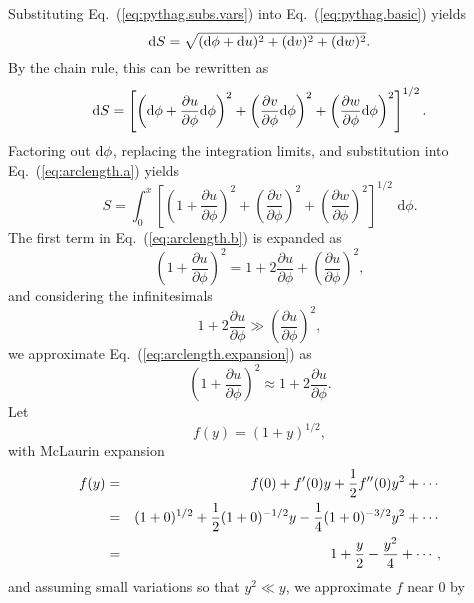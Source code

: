 Substituting Eq.~(\ref{eq:pythag.subs.vars}) into Eq.~(\ref{eq:pythag.basic}) yields
\begin{equation}
\text dS = \sqrt{(\text d\phi + \text du)^2+(\text dv)^2+(\text dw)^2}.
\end{equation} 
By the chain rule, this can be rewritten as
\begin{equation}
\text dS = \left[\left(\text d\phi + \frac{\partial u}{\partial\phi}\text d\phi\right)^2+\left(\frac{\partial v}{\partial\phi}\text d\phi\right)^2+\left(\frac{\partial w}{\partial\phi}\text d\phi\right)^2\right]^{1/2}.
\end{equation}
Factoring out $\text d\phi$, replacing the integration limits, and substitution into Eq.~(\ref{eq:arclength.a}) yields
\begin{equation}
S = \int_0^x \left[\left(1 + \frac{\partial u}{\partial\phi}\right)^2+\left(\frac{\partial v}{\partial\phi}\right)^2+\left(\frac{\partial w}{\partial\phi}\right)^2\right]^{1/2}\text{ d}\phi.
\label{eq:arclength.b}
\end{equation}
The first term in Eq.~(\ref{eq:arclength.b}) is expanded as
\begin{equation}
\left(1 + \frac{\partial u}{\partial\phi}\right)^2 = 1+2\frac{\partial u}{\partial\phi}+\left(\frac{\partial u}{\partial\phi}\right)^2,
\label{eq:arclength.expansion}
\end{equation}
and considering the infinitesimals
\begin{equation}
\label{eq:arclength.u.assump}
1+2\frac{\partial u}{\partial\phi} \gg \left(\frac{\partial u}{\partial\phi}\right)^2,
\end{equation}
we approximate Eq.~(\ref{eq:arclength.expansion}) as
\begin{equation}
\left(1 + \frac{\partial u}{\partial\phi}\right)^2 \approx 1+2\frac{\partial u}{\partial\phi}.
\label{eq:arclength.u.approx}
\end{equation}
Let
\begin{equation}
f(y) = (1+y)^{1/2},
\end{equation}
with McLaurin expansion
\begin{eqnarray}
f(y) &=& f(0)+f'(0)y+\frac{1}{2}f''(0)y^2+\cdots{\vrule width 0in depth .1in}\nonumber \\
&=& (1+0)^{1/2}+\frac{1}{2}(1+0)^{-1/2}y-\frac{1}{4}(1+0)^{-3/2}y^2+\cdots{\vrule width 0in depth .1in}\nonumber \\
&=& 1+\frac{y}{2}-\frac{y^2}{4}+\cdots,
\end{eqnarray}
and assuming small variations so that $y^2\ll y$, we approximate $f$ near 0 by
